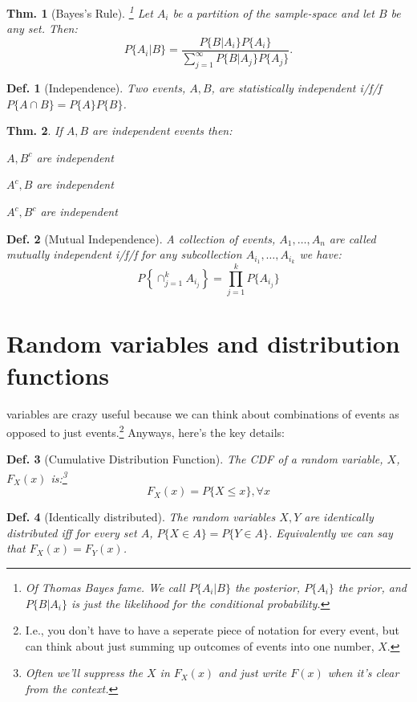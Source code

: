 \documentclass{tufte-book}
\theoremstyle{mytheoremstyle}
\newtheorem*{thm}{Thm.}
\theoremstyle{mylemstyle}
\theoremstyle{mydefstyle}
\newtheorem*{mydef}{Def.}
\begin{document}
\begin{thm}[Bayes's Rule]\footnote{Of Thomas Bayes fame. We call \(P\{A_i | B\}\) the posterior, \(P\{A_i\}\) the prior, and \(P\{B|A_i\}\) is just the likelihood for the conditional probability.}
	Let \(A_i\) be a partition of the sample-space and let \(B\) be any set. Then:
		\[P\{A_i | B\} = \frac{P\{B|A_i\}P\{A_i\}}{\sum_{j = 1}^\infty P\{B|A_j\}P\{A_j\}} \text{.}\]
\end{thm}

\begin{mydef}[Independence]
	Two events, \(A, B\), are statistically independent i/f/f \(P\{A \cap B\} = P\{A\}P\{B\}\).
\end{mydef}

\begin{thm}
	If \(A, B\) are independent events then:
		\begin{description}
			\item \(A, B^c\) are independent
			\item \(A^c, B\) are independent
			\item \(A^c, B^c\) are independent
		\end{description}
\end{thm}

\begin{mydef}[Mutual Independence]
	A collection of events, \(A_1, \dots, A_n\) are called mutually independent i/f/f for any subcollection \(A_{i_1}, \dots, A_{i_k}\) we have:
		\[P\left\{\cap_{j = 1}^k A_{i_j}\right\} = \prod_{j=1}^k P\{A_{i_j}\}\]
\end{mydef}

\section{Random variables and distribution functions}
 variables are crazy useful because we can think about combinations of events as opposed to just events.\footnote{I.e., you don't have to have a seperate piece of notation for every event, but can think about just summing up outcomes of events into one number, \(X\).} Anyways, here's the key details:
\begin{mydef}[Cumulative Distribution Function] The CDF of a random variable, \(X\), \(F_X(x)\) is:\footnote{Often we'll suppress the \(X\) in \(F_X(x)\) and just write \(F(x)\) when it's clear from the context.}
		\[F_X(x) = P\{X \le x\}, \forall x\]
\end{mydef}

\begin{mydef}[Identically distributed] The random variables \(X, Y\) are identically distributed iff for every set \(A\), \(P\{X \in A\} = P\{Y \in A\}\). Equivalently we can say that \(F_X(x) = F_Y(x)\). 
\end{mydef}
\end{document}
